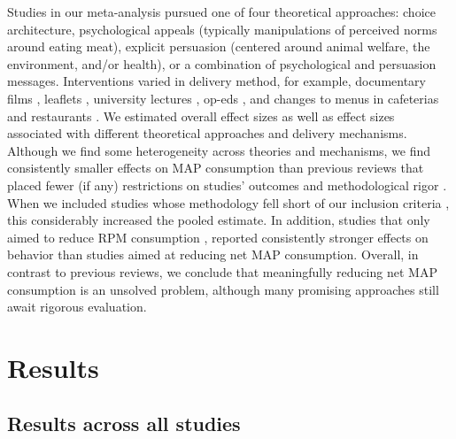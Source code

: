\documentclass[sn-nature,referee,lineno,pdflatex]{sn-jnl}
\begin{document}
Studies in our meta-analysis pursued one of four theoretical approaches:
choice architecture, psychological appeals (typically manipulations of
perceived norms around eating meat), explicit persuasion (centered
around animal welfare, the environment, and/or health), or a combination
of psychological and persuasion messages. Interventions varied in
delivery method, for example, documentary films
\citep{mathur2021effectiveness}, leaflets \citep{peacock2017},
university lectures \citep{jalil2023}, op-eds \citep{haile2021}, and
changes to menus in cafeterias \citep{andersson2021} and restaurants
\citep{coker2022, sparkman2021}. We estimated overall effect sizes as
well as effect sizes associated with different theoretical approaches
and delivery mechanisms. Although we find some heterogeneity across
theories and mechanisms, we find consistently smaller effects on MAP
consumption than previous reviews that placed fewer (if any)
restrictions on studies' outcomes and methodological rigor
\citep{bianchi2018restructuring, byerly2018, chang2023, harguess2020, kwasny2022, mathur2021meta, meier2022}.
When we included studies whose methodology fell short of our inclusion
criteria
\citep{alblas2023, beresford2006, betterfoodfoundation2023, celis2017, dannenberg2023, delichatsios2001eatsmart, epperson2021, frie2022, garnett2020, griesoph2021, hansen2021, johansen2009, kaiser2020, lentz2019, loy2016, matthews2019, piazza2022, reinders2017, sparkman2017},
this considerably increased the pooled estimate. In addition, studies
that only aimed to reduce RPM consumption
\citep{anderson2017, carfora2017correlational, carfora2017randomised, carfora2019, carfora2019informational, delichatsios2001talking, dijkstra2022, emmons2005cancer, emmons2005project, jaacks2014, james2015, lee2018, lindstrom2015, perino2022, schatzkin2000, sorensen2005, wolstenholme2020},
reported consistently stronger effects on behavior than studies aimed at
reducing net MAP consumption. Overall, in contrast to previous reviews,
we conclude that meaningfully reducing net MAP consumption is an
unsolved problem, although many promising approaches still await
rigorous evaluation.

\section{Results}\label{sec2}

\subsection{Results across all studies}\label{sec2.1}
\end{document}
